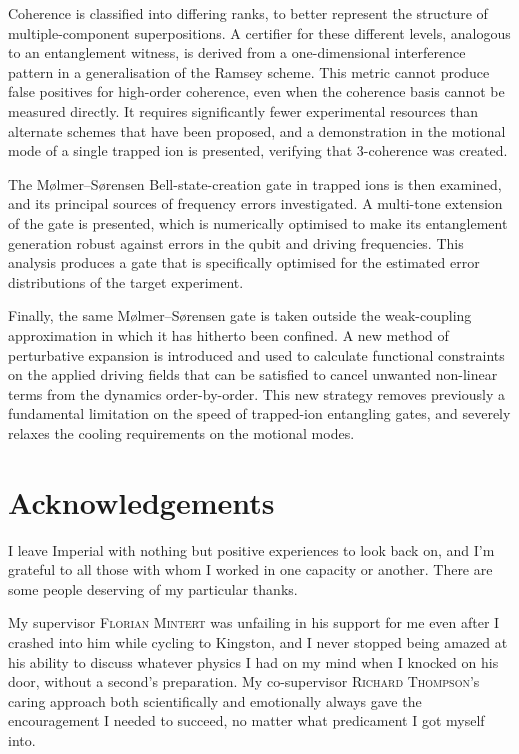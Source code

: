 \documentclass[a4paper,12pt,oneside,british]{scrbook}
\begin{document}
Coherence is classified into differing ranks, to better represent the structure of multiple-component superpositions.
A certifier for these different levels, analogous to an entanglement witness, is derived from a one-dimensional interference pattern in a generalisation of the Ramsey scheme.
This metric cannot produce false positives for high-order coherence, even when the coherence basis cannot be measured directly.
It requires significantly fewer experimental resources than alternate schemes that have been proposed, and a demonstration in the motional mode of a single trapped ion is presented, verifying that 3-coherence was created.

The M\o lmer--S\o rensen Bell-state-creation gate in trapped ions is then examined, and its principal sources of frequency errors investigated.
A multi-tone extension of the gate is presented, which is numerically optimised to make its entanglement generation robust against errors in the qubit and driving frequencies.
This analysis produces a gate that is specifically optimised for the estimated error distributions of the target experiment.

Finally, the same M\o lmer--S\o rensen gate is taken outside the weak-coupling approximation in which it has hitherto been confined.
A new method of perturbative expansion is introduced and used to calculate functional constraints on the applied driving fields that can be satisfied to cancel unwanted non-linear terms from the dynamics order-by-order.
This new strategy removes previously a fundamental limitation on the speed of trapped-ion entangling gates, and severely relaxes the cooling requirements on the motional modes.



\chapter*{Acknowledgements}

I leave Imperial with nothing but positive experiences to look back on, and I'm grateful to all those with whom I worked in one capacity or another.
There are some people deserving of my particular thanks.

My supervisor \textsc{Florian Mintert} was unfailing in his support for me even after I crashed into him while cycling to Kingston, and I never stopped being amazed at his ability to discuss whatever physics I had on my mind when I knocked on his door, without a second's preparation.
My co-supervisor \textsc{Richard Thompson}'s caring approach both scientifically and emotionally always gave the encouragement I needed to succeed, no matter what predicament I got myself into.
\end{document}
